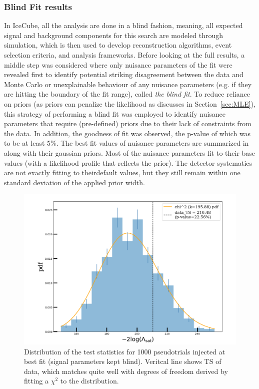 \subsubsection{Blind Fit results}
\label{blindfit}
In IceCube, all the analysis are done in a blind fashion, meaning, all expected signal and background components for this search are modeled through simulation, which is then used to develop reconstruction algorithms, event selection criteria, and analysis frameworks. Before looking at the full results, a middle step was considered where only nuisance parameters of the fit were revealed first to identify potential striking disagreement between the data and Monte Carlo or unexplainable behaviour of any nuisance parameters (e.g. if they are hitting the boundary of the fit range), called \emph{the blind fit}. To reduce reliance on priors (as priors can penalize the likelihood as discusses in Section~\ref{sec:MLE}), this strategy of performing a blind fit was employed to identify nuisance parameters that require (pre-defined) priors due to their lack of constraints from the data. In addition, the goodness of fit was observed, the p-value of which was to be at least 5\%. The best fit values of nuisance parameters are summarized in  along with their gaussian priors. Most of the nuisance parameters fit to their base values (with a likelihood profile that reflects the prior). The detector systematics are not exactly fitting to theirdefault values, but they still remain within one standard deviation of the applied prior width.

\begin{figure}[ht]
	\includegraphics[scale=0.5]{./figures/results/GOF.pdf}
	\caption[GOF test for HESE-12]{Distribution of the test statistics for 1000 pseudotrials injected at best fit (signal parameters kept blind). Veritcal line shows TS of data, which matches quite well with degrees of freedom derived by fitting a $\chi^2$ to the distribution.}
\end{figure}

